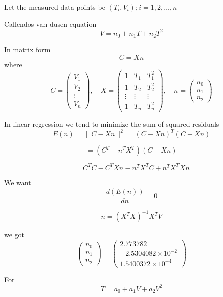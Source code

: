 \documentclass[journal]{IEEEtran}
\begin{document}
Let the measured data points be $(T_i, V_i) ; i = 1,2, \ldots , n$

Callendos van dusen equation
\[
V = n_0 + n_1T + n_2T^2
\]

In matrix form
\[
C = Xn
\]
where
\[
C = \begin{pmatrix}
V_1 \\
V_2 \\
\vdots \\
V_n
\end{pmatrix}, \quad
X = \begin{pmatrix}
1 & T_1 & T_1^2 \\
1 & T_2 & T_2^2 \\
\vdots & \vdots & \vdots \\
1 & T_n & T_n^2
\end{pmatrix}, \quad
n = \begin{pmatrix}
n_0 \\
n_1 \\
n_2
\end{pmatrix}
\]

In linear regression we tend to minimize the sum of squared residuals
\[
E(n) = \|C - Xn\|^2 = (C - Xn)^T (C - Xn)
\]

\[
= (C^T - n^T X^T)(C - Xn)
\]

\[
= C^T C - C^T Xn - n^T X^T C + n^T X^T Xn
\]

We want
\[
\frac{d(E(n))}{dn} = 0
\]

\[
n = (X^T X)^{-1} X^T V
\]

we got
\[
\begin{pmatrix}
n_0 \\
n_1 \\
n_2
\end{pmatrix}
=
\begin{pmatrix}
2.773782 \\
-2.5304082 \times 10^{-2} \\
1.5400372 \times 10^{-4}
\end{pmatrix}
\]

For \[
T = a_0 + a_1 V + a_2 V^2
\]
\end{document}
